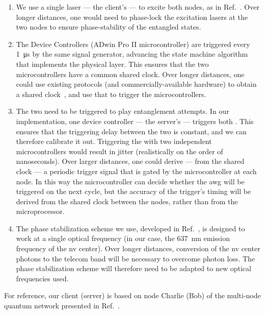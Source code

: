\begin{enumerate}
    \item We use a single laser --- the client's --- to excite both nodes, as in
          Ref.~\cite{pompili_2021_multinode}. Over longer distances, one would need to phase-lock
          the excitation lasers at the two nodes to ensure phase-stability of the entangled states.
    \item The Device Controllers (ADwin Pro II microcontroller) are triggered every \qty{1}{\us} by
          the same signal generator, advancing the state machine algorithm that implements the
          physical layer. This ensures that the two microcontrollers have a common shared clock.
          Over longer distances, one could use existing protocols (and commercially-available
          hardware) to obtain a shared clock~\cite{whiterabbit}, and use that to trigger the
          microcontrollers.
    \item The two  need to be triggered to play entanglement attempts. In our
          implementation, one device controller --- the server's --- triggers both .
          This ensures that the triggering delay between the two  is constant, and
          we can therefore calibrate it out. Triggering the  with two independent
          microcontrollers would result in jitter (realistically on the order of nanoseconds). Over
          larger distances, one could derive --- from the shared clock --- a periodic trigger signal
          that is gated by the microcontroller at each node. In this way the microcontroller can
          decide whether the \acrshort{awg} will be triggered on the next cycle, but the accuracy of
          the trigger's timing will be derived from the shared clock between the nodes, rather than
          from the microprocessor.
    \item The phase stabilization scheme we use, developed in Ref.~\cite{pompili_2021_multinode}, is
          designed to work at a single optical frequency (in our case, the \qty{637}{\nm} emission
          frequency of the \acrshort{nv} center). Over longer distances, conversion of the
          \acrshort{nv} center photons to the telecom band will be necessary to overcome photon
          loss. The phase stabilization scheme will therefore need to be adapted to new optical
          frequencies used.
\end{enumerate}

For reference, our client (server) is based on node Charlie (Bob) of the multi-node quantum network
presented in Ref.~\cite{pompili_2021_multinode}.


